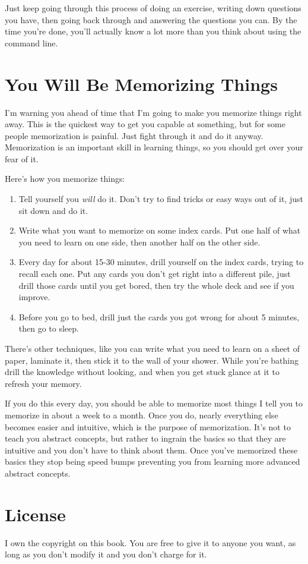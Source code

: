 Just keep going through this process of doing an exercise, writing down
questions you have, then going back through and answering the questions you
can.  By the time you're done, you'll actually know a lot more than you think
about using the command line.

\section{You Will Be Memorizing Things}

I'm warning you ahead of time that I'm going to make you memorize things right away.
This is the quickest way to get you capable at something, but for some people 
memorization is painful.  Just fight through it and do it anyway.  Memorization is an
important skill in learning things, so you should get over your fear of it.

Here's how you memorize things:

\begin{enumerate}
\item Tell yourself you \emph{will} do it.  Don't try to find tricks or easy ways out of it, just sit down and do it.
\item Write what you want to memorize on some index cards.  Put one half of what you need to learn on one side, then
    another half on the other side.
\item Every day for about 15-30 minutes, drill yourself on the index cards, trying to recall each one.  Put any cards you don't
    get right into a different pile, just drill those cards until you get bored, then try the whole deck and see
    if you improve.
\item Before you go to bed, drill just the cards you got wrong for about 5 minutes, then go to sleep.
\end{enumerate}

There's other techniques, like you can write what you need to learn on a sheet of paper, laminate it, then stick it to the
wall of your shower.  While you're bathing drill the knowledge without looking, and when you get stuck glance at it
to refresh your memory.

If you do this every day, you should be able to memorize most things I tell you to memorize in about a week to a
month.  Once you do, nearly everything else becomes easier and intuitive, which is the purpose of memorization.
It's not to teach you abstract concepts, but rather to ingrain the basics so that they are intuitive and you don't
have to think about them.  Once you've memorized these basics they stop being speed bumps preventing you from
learning more advanced abstract concepts.


\section{License}

I own the copyright on this book.  You are free to give it to anyone you want, as long as you 
don't modify it and you don't charge for it.
